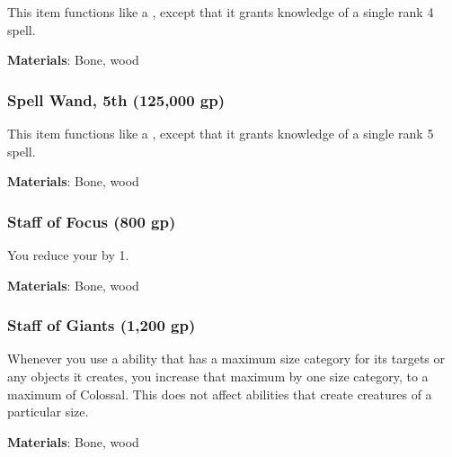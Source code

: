 This item functions like a , except that it grants knowledge of a single rank 4 spell.



\vspace{0.25em}
\textbf{Materials}: Bone, wood


\lowercase{\hypertarget{item:Spell Wand, 5th}{}}\label{item:Spell Wand, 5th}
\hypertarget{item:Spell Wand, 5th}{\subsubsection{Spell Wand, 5th\hfill{} (125,000 gp)}}

This item functions like a , except that it grants knowledge of a single rank 5 spell.



\vspace{0.25em}
\textbf{Materials}: Bone, wood


\lowercase{\hypertarget{item:Staff of Focus}{}}\label{item:Staff of Focus}
\hypertarget{item:Staff of Focus}{\subsubsection{Staff of Focus\hfill{} (800 gp)}}

You reduce your  by 1.



\vspace{0.25em}
\textbf{Materials}: Bone, wood


\lowercase{\hypertarget{item:Staff of Giants}{}}\label{item:Staff of Giants}
\hypertarget{item:Staff of Giants}{\subsubsection{Staff of Giants\hfill{} (1,200 gp)}}

Whenever you use a  ability that has a maximum size category for its targets or any objects it creates, you increase that maximum by one size category, to a maximum of Colossal.
This does not affect abilities that create creatures of a particular size.



\vspace{0.25em}
\textbf{Materials}: Bone, wood


